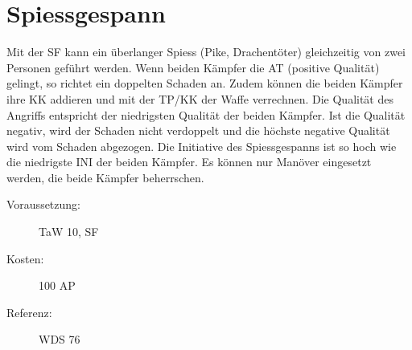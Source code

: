 \section{Spiessgespann}
\label{sf.spiessgespann}
Mit der SF  kann ein überlanger Spiess (Pike, Drachentöter) gleichzeitig von zwei Personen geführt werden.
Wenn beiden Kämpfer die AT (positive Qualität) gelingt, so richtet ein  doppelten Schaden an.
Zudem können die beiden Kämpfer ihre KK addieren und mit der TP/KK der Waffe verrechnen.
Die Qualität des Angriffs entspricht der niedrigsten Qualität der beiden Kämpfer.
Ist die Qualität negativ, wird der Schaden nicht verdoppelt und die höchste negative Qualität wird vom Schaden abgezogen.
Die Initiative des Spiessgespanns ist so hoch wie die niedrigste INI der beiden Kämpfer.
Es können nur Manöver eingesetzt werden, die beide Kämpfer beherrschen.
\begin{description}
    \item[Voraussetzung:]
        TaW  10, SF 
    \item [Kosten:]
        100 AP
    \item [Referenz:]
        WDS 76
\end{description}
